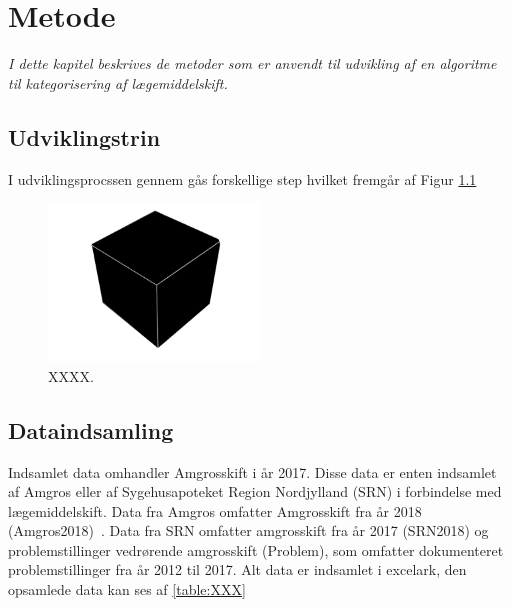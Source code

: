 \chapter{Metode}
\textit{I dette kapitel beskrives de metoder som er anvendt til udvikling af en algoritme til kategorisering af  lægemiddelskift.}

\section{Udviklingstrin}
I udviklingsprocssen gennem gås forskellige step hvilket fremgår af Figur \ref{fig:XXX}

\begin{figure}[H]\centering	\includegraphics[width=0.5\textwidth]{billeder/Black_box.png} 
	\caption{XXXX.}
	\label{fig:XXX}  
\end{figure}

\section{Dataindsamling}
Indsamlet data omhandler Amgrosskift i år 2017. Disse data er enten indsamlet af Amgros eller af Sygehusapoteket Region Nordjylland (SRN) i forbindelse med lægemiddelskift. Data fra Amgros omfatter Amgrosskift fra år 2018 (Amgros2018)~. Data fra SRN omfatter amgrosskift fra år 2017 (SRN2018) og problemstillinger vedrørende amgrosskift (Problem), som omfatter dokumenteret problemstillinger fra år 2012 til 2017. Alt data er indsamlet i excelark, den opsamlede data kan ses af \ref{table:XXX}

